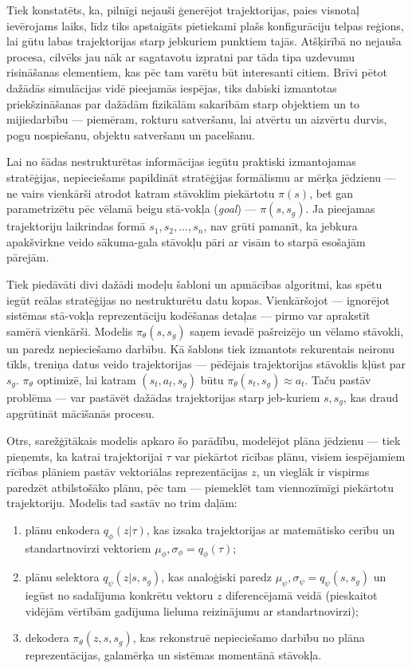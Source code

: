 \documentclass[12pt, a4paper]{article}
\numberwithin{equation}{section} %
\begin{document}
Tiek konstatēts, ka, pilnīgi nejauši ģenerējot trajektorijas, paies visnotaļ ievērojams laiks, līdz tiks apstaigāts pietiekami plašs konfigurāciju telpas reģions, lai gūtu labas trajektorijas starp jebkuriem punktiem tajās. Atšķirībā no nejauša procesa, cilvēks jau nāk ar sagatavotu izpratni par tāda tipa uzdevumu risināšanas elementiem, kas pēc tam varētu būt interesanti citiem. Brīvi pētot dažādās simulācijas vidē pieejamās iespējas, tiks dabiski izmantotas priekšzināšanas par dažādām fizikālām sakarībām starp objektiem un to mijiedarbību --- piemēram, rokturu satveršanu, lai atvērtu un aizvērtu durvis, pogu nospiešanu, objektu satveršanu un pacelšanu.

Lai no šādas nestrukturētas informācijas iegūtu praktiski izmantojamas stratēģijas, nepieciešams papildināt stratēģijas formālismu ar mērķa jēdzienu --- ne vairs vienkārši atrodot katram stāvoklim piekārtotu $\pi(s)$, bet gan parametrizētu pēc vēlamā beigu stā-vokļa (\textit{goal}) --- $\pi(s,s_{g})$. Ja pieejamas trajektoriju laikrindas formā $s_1, s_2, ..., s_n$, nav grūti pamanīt, ka jebkura apakšvirkne veido sākuma-gala stāvokļu pāri ar visām to starpā esošajām pārejām.

Tiek piedāvāti divi dažādi modeļu šabloni un apmācības algoritmi, kas spētu iegūt reālas stratēģijas no nestrukturētu datu kopas. Vienkāršojot --- ignorējot sistēmas stā-vokļa reprezentāciju kodēšanas detaļas --- pirmo var aprakstīt samērā vienkārši. Modelis $\pi_{\theta}(s,s_g)$ saņem ievadē pašreizējo un vēlamo stāvokli, un paredz nepieciešamo darbību. Kā šablons tiek izmantots rekurentais neironu tīkls, treniņa datus veido trajektorijas --- pēdējais trajektorijas stāvoklis kļūst par $s_g$. $\pi_{\theta}$ optimizē, lai katram $(s_t, a_t, s_g)$ būtu $\pi_{\theta}(s_t, s_g) \approx a_t$. Taču pastāv problēma --- var pastāvēt dažādas trajektorijas starp jeb-kuriem $s, s_g$, kas draud apgrūtināt mācīšanās procesu.

Otrs, sarežģītākais modelis apkaro šo parādību, modelējot plāna jēdzienu --- tiek pieņemts, ka katrai trajektorijai $\tau$ var piekārtot rīcības plānu, visiem iespējamiem rīcības plāniem pastāv vektoriālas reprezentācijas $z$, un vieglāk ir vispirms paredzēt atbilstošāko plānu, pēc tam --- piemeklēt tam viennozīmīgi piekārtotu trajektoriju. Modelis tad sastāv no trim daļām:

\begin{enumerate}
    \item plānu enkodera $q_{\phi}(z \vert \tau)$, kas izsaka trajektorijas ar matemātisko cerību un standartnovirzi vektoriem $\mu_{\phi}, \sigma_{\phi} = q_{\phi}(\tau)$;
    \item plānu selektora $q_{\psi}(z \vert s, s_g)$, kas analoģiski paredz $\mu_{\psi}, \sigma_{\psi} = q_{\psi}(s, s_g)$ un iegūst no sadalījuma konkrētu vektoru $z$ diferencējamā veidā (pieskaitot vidējām vērtībām gadījuma lieluma reizinājumu ar standartnovirzi);
    \item dekodera $\pi_{\theta}(z, s, s_g)$, kas rekonstruē nepieciešamo darbību no plāna reprezentācijas, galamērķa un sistēmas momentānā stāvokļa.
\end{enumerate}
\end{document}
